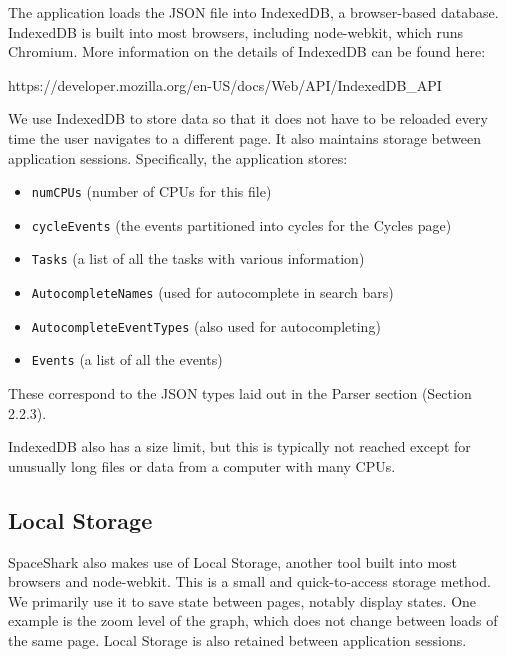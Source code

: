 \documentclass{hmcclinic}
\begin{document}
  The application loads the JSON file into IndexedDB, a
  browser-based database. IndexedDB is built into most browsers, including
  node-webkit, which runs Chromium. More information on the details of IndexedDB can be found here:
\begin{center}
  https://developer.mozilla.org/en-US/docs/Web/API/IndexedDB\_API
\end{center}
  We use IndexedDB to store data so that it does not have to be reloaded every time the user navigates to a different page. It also
  maintains storage between application sessions.
  Specifically, the application stores:
  \begin{itemize}
    \item \texttt{numCPUs} (number of CPUs for this file)
    \item \texttt{cycleEvents} (the events partitioned into cycles for the Cycles page)
    \item \texttt{Tasks} (a list of all the tasks with various information)
    \item \texttt{AutocompleteNames} (used for autocomplete in search bars)
    \item \texttt{AutocompleteEventTypes} (also used for autocompleting)
    \item \texttt{Events} (a list of all the events)
  \end{itemize}
  These correspond to the JSON types laid
  out in the Parser section (Section 2.2.3).



  IndexedDB also has  a size limit, but this is typically not reached except for
  unusually long files or data from a computer with many CPUs. 

  \subsection{Local Storage}

  SpaceShark also makes use of Local Storage, another tool
  built into most browsers and node-webkit. This is a small and quick-to-access
  storage method. We primarily use it to save state between pages, notably
  display states. One example is the zoom level of the graph, which does not
  change between loads of the same page. Local Storage is also retained between
  application sessions.
\end{document}
